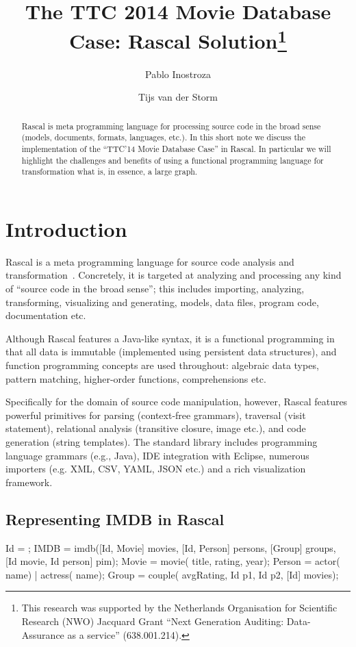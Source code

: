 \documentclass[submission,copyright,creativecommons]{eptcs}
\title{The TTC 2014 Movie Database Case: Rascal Solution\thanks{This
    research was supported by the Netherlands Organisation for
    Scientific Research (NWO) Jacquard Grant ``Next Generation
    Auditing: Data-Assurance as a service'' (638.001.214).}}
\author{Pablo Inostroza \and Tijs van der Storm}
\begin{document}
\maketitle

\begin{abstract}
Rascal is meta programming language for processing source code in the broad sense (models, documents, formats, languages, etc.). In this short note we discuss the implementation of the ``TTC'14 Movie Database Case'' in Rascal. In particular we will highlight the challenges and benefits of using a functional programming language for transformation what is, in essence, a large graph. 
\end{abstract}

\section{Introduction}

Rascal is a meta programming language for source code analysis and transformation~\cite{Rascal,RascalGTTSE}. 
Concretely, it is targeted at analyzing and processing any kind of ``source code in the broad sense''; this includes importing, analyzing, transforming, visualizing and generating, models, data files, program code, documentation etc.
 
Although Rascal features a Java-like syntax, it is a functional programming in that all data is immutable (implemented using persistent data structures), and function programming concepts are used throughout: algebraic data types, pattern matching, higher-order functions, comprehensions etc. 

Specifically for the domain of source code manipulation, however, Rascal features powerful primitives for parsing (context-free grammars), traversal (visit statement), relational analysis (transitive closure, image etc.), and code generation (string templates). 
The standard library includes programming language grammars (e.g., Java), IDE integration
with Eclipse, numerous importers (e.g. XML, CSV, YAML, JSON etc.) and a rich visualization framework. 

\subsection{Representing IMDB in Rascal}

\begin{rascal}
 Id = ;
 IMDB = imdb([Id, Movie] movies, [Id, Person] persons, 
                  [Group] groups, [Id movie, Id person] pim);
 Movie = movie( title,  rating,  year);
 Person 
  = actor( name) 
  | actress( name);
 Group = couple( avgRating, Id p1, Id p2, [Id] movies);
\end{rascal}
\end{document}

